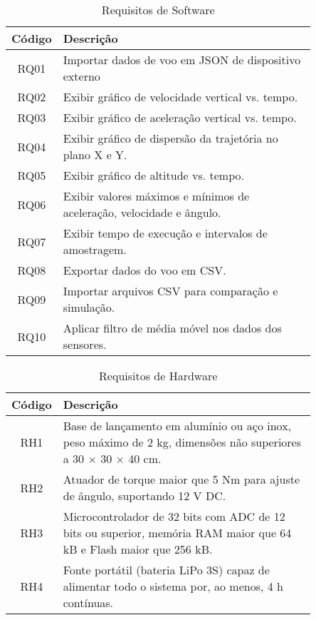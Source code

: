 \begin{table}[htpb]
\centering
\scriptsize %
\setlength{\tabcolsep}{4pt} %
\caption{Requisitos de Software} %
\begin{tabular}{|c|p{0.85\linewidth}|}
\hline
\textbf{Código} & \textbf{Descrição} \\
\hline
RQ01 & Importar dados de voo em JSON de dispositivo externo \\
\hline
RQ02 & Exibir gráfico de velocidade vertical vs. tempo. \\
\hline
RQ03 & Exibir gráfico de aceleração vertical vs. tempo. \\
\hline
RQ04 & Exibir gráfico de dispersão da trajetória no plano X e Y. \\
\hline
RQ05 & Exibir gráfico de altitude vs. tempo. \\
\hline
RQ06 & Exibir valores máximos e mínimos de aceleração, velocidade e ângulo. \\
\hline
RQ07 & Exibir tempo de execução e intervalos de amostragem. \\
\hline
RQ08 & Exportar dados do voo em CSV. \\
\hline
RQ09 & Importar arquivos CSV para comparação e simulação. \\
\hline
RQ10 & Aplicar filtro de média móvel nos dados dos sensores. \\
\hline
\end{tabular}
\label{tab:requisitos_detalhados} %
\end{table}


\begin{table}[htpb]
\centering
\scriptsize
\setlength{\tabcolsep}{4pt}
\caption{Requisitos de Hardware}
\begin{tabular}{|c|p{0.85\linewidth}|}
\hline
\textbf{Código} & \textbf{Descrição} \\
\hline
RH1 & Base de lançamento em alumínio ou aço inox, peso máximo de 2 kg, dimensões não superiores a 30 × 30 × 40 cm. \\
\hline
RH2 & Atuador de torque maior que 5 Nm para ajuste de ângulo, suportando 12 V DC. \\
\hline
RH3 & Microcontrolador de 32 bits com ADC de 12 bits ou superior, memória RAM maior que 64 kB e Flash maior que 256 kB. \\
\hline
RH4 & Fonte portátil (bateria LiPo 3S) capaz de alimentar todo o sistema por, ao menos, 4 h contínuas. \\
\hline
\end{tabular}
\label{tab:requisitos-hardware}
\end{table}

